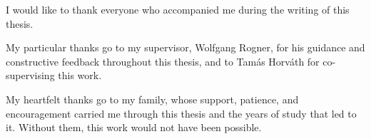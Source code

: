 I would like to thank everyone who accompanied me during the writing
of this thesis.

My particular thanks go to my supervisor, Wolfgang Rogner, for his
guidance and constructive feedback throughout this thesis, and to
Tam\'as Horv\'ath for co-supervising this work.

My heartfelt thanks go to my family, whose support, patience, and
encouragement carried me through this thesis and the years of study
that led to it. Without them, this work would not have been possible.
